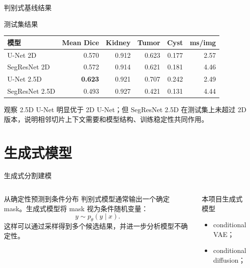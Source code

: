\documentclass[10pt]{beamer}
\begin{document}
\begin{frame}{判别式基线结果}
  \begin{block}{测试集结果}
    \centering
    \small
    \setlength{\tabcolsep}{4pt}
    \begin{tabular}{lrrrrr}
      \toprule
      模型 & Mean Dice & Kidney & Tumor & Cyst & ms/img \\
      \midrule
      U-Net 2D & 0.570 & 0.912 & 0.623 & 0.177 & 2.57 \\
      SegResNet 2D & 0.572 & 0.914 & 0.621 & 0.181 & 4.46 \\
      U-Net 2.5D & \textbf{0.623} & 0.921 & 0.707 & 0.242 & 2.49 \\
      SegResNet 2.5D & 0.493 & 0.927 & 0.421 & 0.131 & 4.44 \\
      \bottomrule
    \end{tabular}
  \end{block}
  \begin{alertblock}{观察}
    2.5D U-Net 明显优于 2D U-Net；但 SegResNet 2.5D 在测试集上未超过 2D 版本，说明相邻切片上下文需要和模型结构、训练稳定性共同作用。
  \end{alertblock}
\end{frame}

\section{生成式模型}

\begin{frame}{生成式分割建模}
  \begin{columns}[T]
      \begin{block}{从确定性预测到条件分布}
        判别式模型通常输出一个确定 mask。生成式模型将 mask 视为条件随机变量：
        \[
          y\sim p_\theta(y\mid x).
        \]
        这样可以通过采样得到多个候选结果，并进一步分析模型不确定性。
      \end{block}
      \begin{exampleblock}{本项目生成式模型}
        \begin{itemize}
          \item conditional VAE；
          \item conditional diffusion；
        \end{itemize}
      \end{exampleblock}
  \end{columns}
\end{frame}
\end{document}
